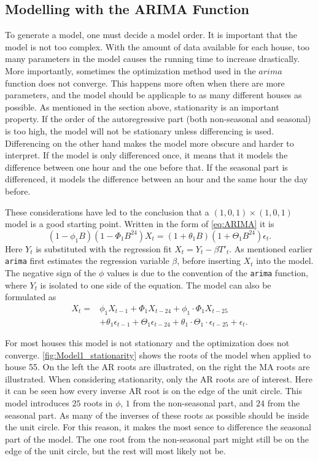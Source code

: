 \subsection{Modelling with the ARIMA Function}
To generate a model, one must decide a model order. It is important that the model is not too complex. With the amount of data available for each house, too many parameters in the model causes the running time to increase drastically. More importantly, sometimes the optimization method used in the $arima$ function does not converge. This happens more often when there are more parameters, and the model should be applicaple to as many different houses as possible. As mentioned in the section above, stationarity is an important property. If the order of the autoregressive part (both non-seasonal and seasonal) is too high, the model will not be stationary unless differencing is used. Differencing on the other hand makes the model more obscure and harder to interpret. If the model is only differenced once, it means that it models the difference between one hour and the one before that. If the seasonal part is differenced, it models the difference between an hour and the same hour the day before.

\noindent These considerations have led to the conclusion that a $(1,0,1)\times (1,0,1)$ model is a good starting point. Written in the form of \cref{eq:ARIMA} it is
\begin{equation}
    (1-\phi_1 B)(1-\Phi_1 B^{24})X_t = (1+\theta_1 B)(1+\Theta_1 B^{24}) \epsilon_t. \label{eq:model1}
\end{equation}
Here $Y_t$ is substituted with the regression fit $X_t = Y_t -\beta T'_t$. As mentioned earlier \texttt{arima} first estimates the regression variable $\beta$, before inserting $X_t$ into the model. The negative sign of the $\phi$ values is due to the convention of the \texttt{arima} function, where $Y_t$ is isolated to one side of the equation. The model can also be formulated as
\begin{align}
    X_t = &\phi_1 X_{t-1} + \Phi_1 X_{t-24} + \phi_1 \cdot \Phi_1  X_{t-25}\nonumber\\  &+ \theta_1 \epsilon_{t-1} + \Theta_1 \epsilon_{t-24} + \theta_1 \cdot \Theta_1 \cdot \epsilon_{t-25} + \epsilon_t.
\end{align}

\noindent For most houses this model is not stationary and the optimization does not converge. \cref{fig:Model1_stationarity} shows the roots of the model when applied to house 55. On the left the AR roots are illustrated, on the right the MA roots are illustrated. When considering stationarity, only the AR roots are of interest. Here it can be seen how every inverse AR root is on the edge of the unit circle. This model introduces $25$ roots in $\phi$, $1$ from the non-seasonal part, and $24$ from the seasonal part. As many of the inverses of these roots as possible should be inside the unit circle. For this reason, it makes the most sence to difference the seasonal part of the model. The one root from the non-seasonal part might still be on the edge of the unit circle, but the rest will most likely not be.

